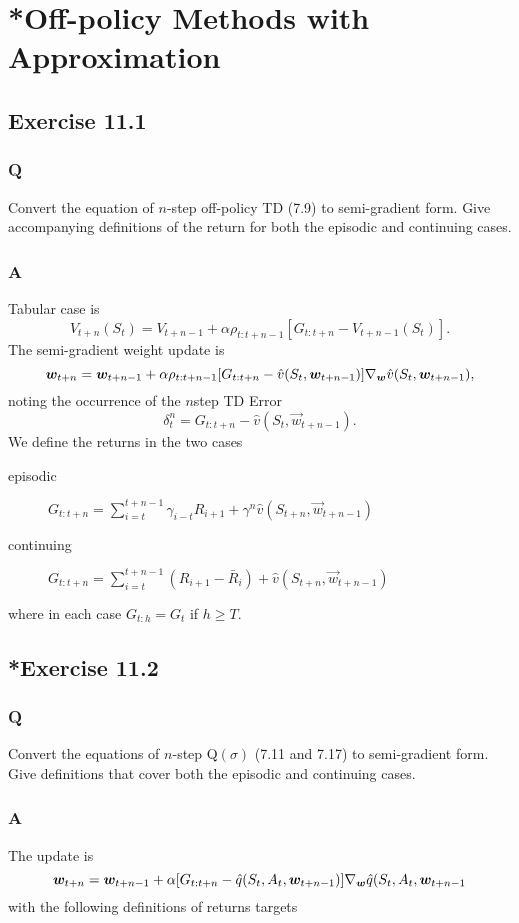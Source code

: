\section{*Off-policy Methods with Approximation}

\subsection{Exercise 11.1}
\subsubsection*{Q}
Convert the equation of $n$-step off-policy TD (7.9) to semi-gradient form. Give accompanying definitions of the return for both the episodic and continuing cases.
\subsubsection*{A}
Tabular case is 
\[ 
    V_{t+n}(S_t) = V_{t+n-1} + \alpha \rho_{t:t+n-1} [G_{t:t+n} - V_{t+n-1}(S_t)].
\]
The semi-gradient weight update is
\[
    \boldsymbol{w}_{t+n} = \boldsymbol{w}_{t+n-1} + \alpha \rho_{t:t+n-1}[G_{t:t+n} - \hat{v}(S_t, \boldsymbol{w}_{t+n-1})] \nabla_{\boldsymbol{w}}\hat{v}(S_t, \boldsymbol{w}_{t+n-1}),
\]
noting the occurrence of the $n$step TD Error
\[
    \delta_t^n = G_{t:t+n} - \hat{v}(S_t, \vec{w}_{t+n-1}).
\]
We define the returns in the two cases
\begin{description}
    \item[episodic] $G_{t:t+n} = \sum_{i=t}^{t+n-1}\gamma_{i-t}R_{i+1} + \gamma^n \hat{v}(S_{t+n}, \vec{w}_{t+n-1})$
    \item[continuing] $G_{t:t+n} = \sum_{i=t}^{t+n-1}(R_{i+1} - \bar{R}_i) + \hat{v}(S_{t+n}, \vec{w}_{t+n-1})$
\end{description}
where in each case $G_{t:h} = G_t$ if $h \geq T$.
    

\subsection{*Exercise 11.2}
\subsubsection*{Q}
Convert the equations of $n$-step Q$(\sigma)$ (7.11 and 7.17) to semi-gradient form. Give definitions that cover both the episodic and continuing cases.

\subsubsection*{A}
The update is 
\[
    \boldsymbol{w}_{t+n} = \boldsymbol{w}_{t+n-1} + \alpha [G_{t:t+n} - \hat{q}(S_t, A_t, \boldsymbol{w}_{t+n-1})] \nabla_{\boldsymbol{w}} \hat{q}(S_t, A_t, \boldsymbol{w}_{t+n-1}
\]
with the following definitions of returns targets\\

